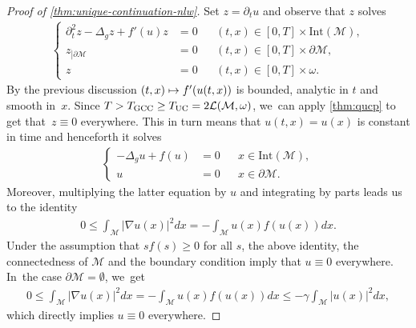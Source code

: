 \documentclass[10pt]{amsart}
\newcommand\mto{\mathchoice{\longmapsto}{\mapsto}{\mapsto}{\mapsto}}
\theoremstyle{definition}
\let\mc\mathcal
\newcommand{\M}{\mc{M}}
\begin{document}
\begin{proof}[Proof of \cref{thm:unique-continuation-nlw}]
Set $z=\partial_t u$ and observe that $z$ solves
\begin{align}\label{thm:proof:eq:nlw-unique-cont}
\left\{\begin{aligned}
\partial_t^2 z-\Delta_g z+f'(u)z&=0 &&(t, x)\in [0, T]\times \text{Int}(\M),\\
z_{\left|\partial\M\right.}&=0 &&(t, x)\in [0, T]\times\partial\M,\\
z&=0 &&(t, x)\in [0, T]\times \omega.
\end{aligned}\right.
\end{align}
By the previous discussion $(t, x)\mto f'(u(t, x))$ is bounded, analytic in $t$ and smooth in~$x$. Since $T>T_{\textup{GCC}}\geq T_{\textup{UC}}=2\mc{L}(\M, \omega)$, we~can apply \cref{thm:qucp} to get that~$z\equiv 0$ everywhere. This in turn means that $u(t, x)=u(x)$ is constant in time and henceforth it solves
\begin{align}
\left\{\begin{aligned}
-\Delta_g u+f(u)&=0 &&x\in\text{Int}(\M),\\
u&=0 &&x\in \partial\M.
\end{aligned}\right.
\end{align}
Moreover, multiplying the latter equation by $u$ and integrating by parts leads us to the identity
\begin{align*}
0\leq \int_\M |\nabla u(x)|^2 dx=-\int_\M u(x)f(u(x)) dx.
\end{align*}
Under the assumption that $sf(s)\geq 0$ for all $s$, the above identity, the connectedness of $\M$ and the boundary condition imply that $u\equiv 0$ everywhere. In~the case $\partial\M=\emptyset$, we~get
\begin{align*}
0\leq \int_\M |\nabla u(x)|^2 dx=-\int_\M u(x)f(u(x)) dx\leq -\gamma\int_\M |u(x)|^2dx,
\end{align*}
which directly implies $u\equiv 0$ everywhere.
\end{proof}
\end{document}
